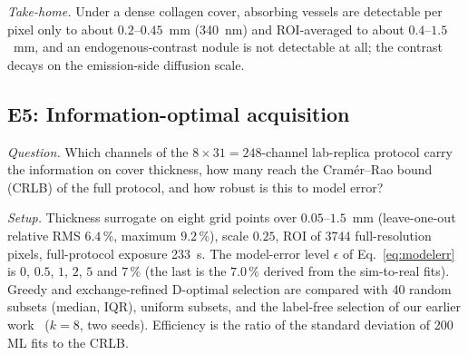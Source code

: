 \documentclass[journal]{IEEEtran}
\begin{document}
\emph{Take-home.} Under a dense collagen cover, absorbing vessels are detectable per pixel only to about $0.2$--$0.45$~mm (340~nm) and ROI-averaged to about $0.4$--$1.5$~mm, and an endogenous-contrast nodule is not detectable at all; the contrast decays on the emission-side diffusion scale.

\subsection{E5: Information-optimal acquisition}
\emph{Question.} Which channels of the $8\times31=248$-channel lab-replica protocol carry the information on cover thickness, how many reach the Cram\'er--Rao bound (CRLB) of the full protocol, and how robust is this to model error?

\emph{Setup.} Thickness surrogate on eight grid points over $0.05$--$1.5$~mm (leave-one-out relative RMS $6.4\,\%$, maximum $9.2\,\%$), scale $0.25$, ROI of 3744 full-resolution pixels, full-protocol exposure 233~s. The model-error level $\epsilon$ of Eq.~\eqref{eq:modelerr} is $0$, $0.5$, $1$, $2$, $5$ and $7\,\%$ (the last is the $7.0\,\%$ derived from the sim-to-real fits). Greedy and exchange-refined D-optimal selection are compared with 40 random subsets (median, IQR), uniform subsets, and the label-free selection of our earlier work~\cite{meloyan2025scirep} ($k=8$, two seeds). Efficiency is the ratio of the standard deviation of 200 ML fits to the CRLB.
\end{document}
